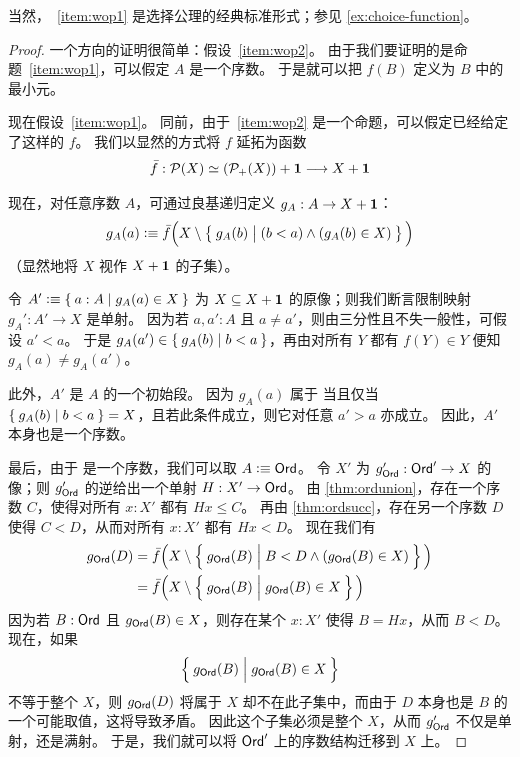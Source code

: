 \noindent
当然，~\ref{item:wop1} 是选择公理的经典标准形式；参见 \cref{ex:choice-function}。

\begin{proof}
  一个方向的证明很简单：假设~\ref{item:wop2}。
  由于我们要证明的是命题~\ref{item:wop1}，可以假定 $A$ 是一个序数。
  于是就可以把 $f(B)$ 定义为 $B$ 中的最小元。

  现在假设~\ref{item:wop1}。
  同前，由于~\ref{item:wop2} 是一个命题，可以假定已经给定了这样的 $f$。
  我们以显然的方式将 $f$ 延拓为函数
  \[ \bar f:\mathcal{P}(X) \simeq (\mathcal{P}_+(X)) + \mathbf{1} \longrightarrow X+\mathbf{1}
  \]

  现在，对任意序数 $A$，可通过良基递归定义 $g_A : A \to X + \mathbf{1}$：
  \[ g_A(a) \vcentcolon\equiv
    \bar f\Big(X \setminus \Set{ g_A(b) | \strut (b<a) \wedge (g_A(b) \in X) }\Big)
  \]
  （显然地将 $X$ 视作 $X + \mathbf{1}$ 的子集）。

  令 $A'\vcentcolon\equiv \Set{a:A | g_A(a) \in X}$ 为 $X \subseteq X + \mathbf{1}$ 的原像；则我们断言限制映射 $g_A' : A' \to X$ 是单射。
  因为若 $a, a' : A$ 且 $a \neq a'$，则由三分性且不失一般性，可假设 $a' < a$。
  于是 $g_A(a') \in \Set{ g_A(b) | b<a }$，再由对所有 $Y$ 都有 $f(Y) \in Y$ 便知 $g_A(a) \neq g_A(a')$。

  此外，$A'$ 是 $A$ 的一个初始段。
  因为 $g_A(a)$ 属于 \unit 当且仅当 $\Set{g_A(b)|b<a} = X$，且若此条件成立，则它对任意 $a' > a$ 亦成立。
  因此，$A'$ 本身也是一个序数。

  最后，由于 \ord 是一个序数，我们可以取 $A \vcentcolon\equiv \mathsf{Ord}$。
  令 $X'$ 为 $g_{\mathsf{Ord}}' : \mathsf{Ord}' \to X$ 的像；则 $g_{\mathsf{Ord}}'$ 的逆给出一个单射 $H : X' \to \mathsf{Ord}$。
  由 \cref{thm:ordunion}，存在一个序数 $C$，使得对所有 $x : X'$ 都有 $Hx \le C$。
  再由 \cref{thm:ordsucc}，存在另一个序数 $D$ 使得 $C < D$，从而对所有 $x : X'$ 都有 $Hx < D$。
  现在我们有
  \begin{align*}
    g_{\ord}(D) &= \bar f\Big( X \setminus \setof{ g_{\ord}(B) | \rule{0pt}{1em} B<D \wedge (g_{\ord}(B) \in X)} \Big)\\
    &=\bar f\Big( X \setminus \setof{ g_{\ord}(B) | \rule{0pt}{1em} g_{\ord}(B) \in X} \Big)
  \end{align*}
  因为若 $B : \mathsf{Ord}$ 且 $g_{\mathsf{Ord}}(B) \in X$，则存在某个 $x : X'$ 使得 $B = Hx$，从而 $B < D$。
  现在，如果
  \[\setof{ g_{\ord}(B) | \rule{0pt}{1em} g_{\ord}(B) \in X}\]
  不等于整个 $X$，则 $g_{\mathsf{Ord}}(D)$ 将属于 $X$ 却不在此子集中，而由于 $D$ 本身也是 $B$ 的一个可能取值，这将导致矛盾。
  因此这个子集必须是整个 $X$，从而 $g_{\mathsf{Ord}}'$ 不仅是单射，还是满射。
  于是，我们就可以将 $\mathsf{Ord}'$ 上的序数结构迁移到 $X$ 上。
\end{proof}

